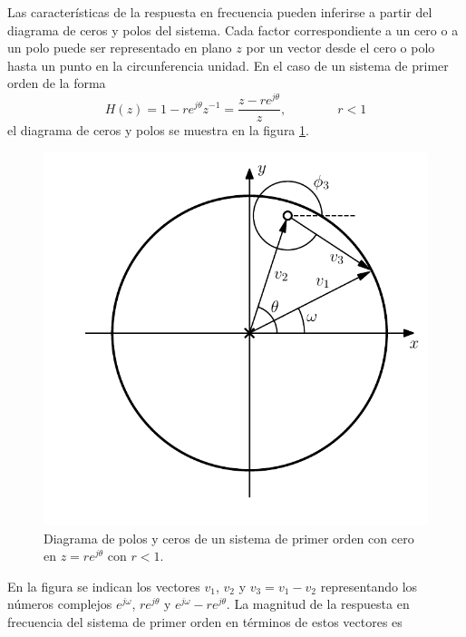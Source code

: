 \documentclass[a4paper]{report}
\begin{document}
Las características de la respuesta en frecuencia pueden inferirse a partir del diagrama de ceros y polos del sistema. Cada factor correspondiente a un cero o a un polo puede ser representado en plano \(z\) por un vector desde el cero o polo hasta un punto en la circunferencia unidad. En el caso de un sistema de primer orden de la forma
\[
 H(z)=1-re^{j\theta}z^{-1}=\frac{z-re^{j\theta}}{z},
 \qquad\qquad 
 r<1
\]
el diagrama de ceros y polos se muestra en la figura \ref{fig:transform_analysis_first_order_zplane}.
 \begin{figure}[!htb]
  \begin{minipage}[c]{0.53\textwidth}
    \includegraphics[width=\textwidth]{figuras/transform_analysis_first_order_zplane.pdf}
  \end{minipage}\hfill
  \begin{minipage}[c]{0.38\textwidth}
    \caption{
     Diagrama de polos y ceros de un sistema de primer orden con cero en \(z=re^{j\theta}\) con \(r<1\).
    }\label{fig:transform_analysis_first_order_zplane}
  \end{minipage}
\end{figure}
En la figura se indican los vectores \(v_1\), \(v_2\) y \(v_3=v_1-v_2\) representando los números complejos \(e^{j\omega}\), \(re^{j\theta}\) y \(e^{j\omega}-re^{j\theta}\). La magnitud de la  respuesta en frecuencia del sistema de primer orden en términos de estos vectores es
\end{document}

